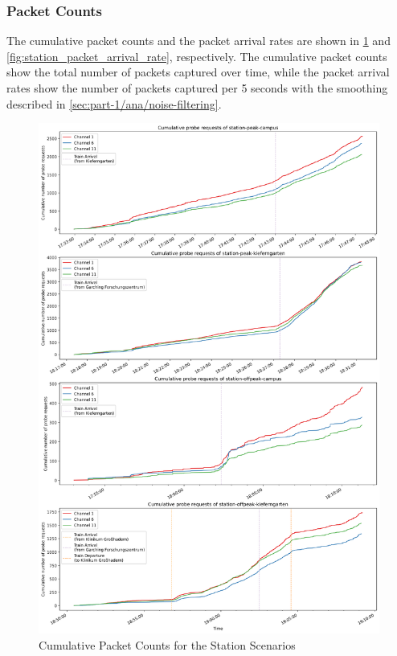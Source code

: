 \documentclass[sigconf,nonacm]{acmart}
\begin{document}
\subsubsection{Packet Counts}
\label{sec:part-1/station/packet-counts}

The cumulative packet counts and the packet arrival rates are shown in \cref{fig:station_cumulative_packet_counts} and \cref{fig:station_packet_arrival_rate}, respectively. The cumulative packet counts show the total number of packets captured over time, while the packet arrival rates show the number of packets captured per 5 seconds with the smoothing described in \cref{sec:part-1/ana/noise-filtering}.

\begin{figure}
    \centering
    \includegraphics[width=\columnwidth]{images/part1/cumulative-packet-counts/station-scenarios.png}
    \caption{Cumulative Packet Counts for the Station Scenarios}
    \label{fig:station_cumulative_packet_counts}
\end{figure}
\end{document}
